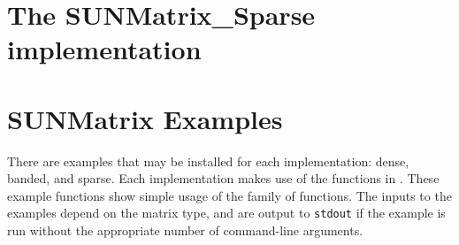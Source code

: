 \section{The SUNMatrix\_Sparse implementation}\label{ss:sunmat_sparse}



\section{SUNMatrix Examples}\label{ss:sunmat_examples}

There are  examples that may be installed for each
implementation: dense, banded, and sparse.  Each implementation
makes use of the functions in . 
These example functions show simple usage of the  family
of functions.  The inputs to the examples depend on the matrix type,
and are output to \texttt{stdout} if the example is run without the
appropriate number of command-line arguments. 

